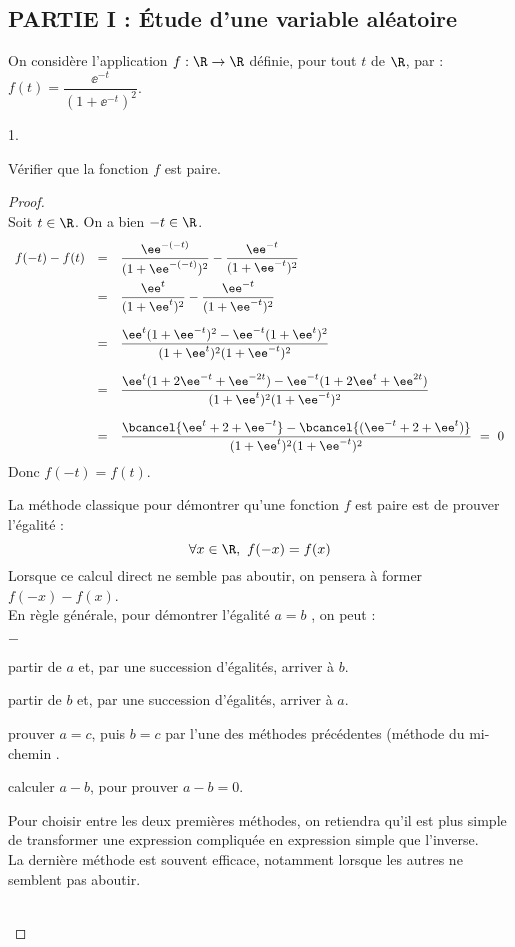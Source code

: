 \subsection*{PARTIE I : Étude d'une variable aléatoire}

\noindent
On considère l'application $f:\R\rightarrow\R$ définie, 
pour tout $t$ de $\R$, par : 
$f(t)=\dfrac{\ee^{-t}}{(1+\ee^{-t})^2}$.

\begin{noliste}{1.}
\setlength{\itemsep}{2mm}
\item Vérifier que la fonction $f$ est paire.

\begin{proof}~\\
 Soit $t\in\R$. On a bien $-t\in\R$.
 \[
  \begin{array}{rcl}
    f(-t) - f(t) & = & \dfrac{\ee^{-(-t)}}{(1+\ee^{-(-t)})^2}
    - \dfrac{\ee^{-t}}{(1+\ee^{-t})^2}
    \\[.4cm]
    & = & \dfrac{\ee^t}{(1+\ee^t)^2} - \dfrac{\ee^{-t}}{(1+\ee^{-t})^2}
    \\[.6cm]
    & = & \dfrac{\ee^t(1+\ee^{-t})^2-\ee^{-t}(1+\ee^t)^2}
    {(1+\ee^t)^2 (1+\ee^{-t})^2}
    \\[.6cm]
    & = & \dfrac{\ee^t(1+2\ee^{-t}+\ee^{-2t}) 
    - \ee^{-t}(1+2\ee^t+\ee^{2t})}
    {(1+\ee^t)^2 (1+\ee^{-t})^2}
    \\[.6cm]
    & = & \dfrac{\bcancel{\ee^t +2+\ee^{-t}} - \bcancel{(\ee^{-t}
    +2+\ee^t)}}{(1+\ee^t)^2 (1+\ee^{-t})^2} \ = \ 0
  \end{array}
 \]
 Donc $f(-t)=f(t)$.
 
 \begin{remark}%
  La méthode classique pour démontrer qu'une fonction $f$ est paire
  est de prouver l'égalité :
  \[
   \forall x \in \R, \ f(-x)=f(x)
  \]
  Lorsque ce calcul direct ne semble pas aboutir, on pensera à 
  former $f(-x)-f(x)$.\\[.2cm]
  En règle générale, pour démontrer l'égalité \og $a=b$ \fg{}, on peut :
  \begin{noliste}{$-$}
   \item partir de $a$ et, par une succession d'égalités, arriver à $b$.
   \item partir de $b$ et, par une succession d'égalités, arriver à $a$.
   \item prouver $a=c$, puis $b=c$ par l'une des méthodes précédentes 
   (méthode du \og mi-chemin \fg{}.
   \item calculer $a-b$, pour prouver $a-b=0$.
  \end{noliste}
  Pour choisir entre les deux premières méthodes, on retiendra qu'il 
est plus simple de transformer une expression \og compliquée \fg{} en 
expression \og simple \fg{} que l'inverse.\\
La dernière méthode est souvent efficace, notamment lorsque les autres 
ne semblent pas aboutir.
 \end{remark}~\\[-1.2cm]
\end{proof}




\end{noliste}
